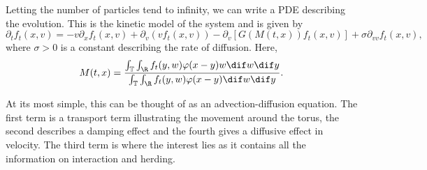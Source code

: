 Letting the number of particles tend to infinity, we can write a PDE describing the evolution. This is the kinetic model of the system and is given by
\begin{equation}\label{eq:fullPDE}
 \partial_t f_t(x,v) = -v\partial_x f_t(x,v)  +\partial_v\left( v f_t(x,v)\right) - \partial_v \left[ G(M(t,x))f_t(x,v)\right] + \sigma \partial_{vv}f_t(x,v),
\end{equation}
 where $\sigma > 0$ is a constant describing the rate of diffusion. Here, 
\[ M(t,x) =  \frac{\int_{\T}\int_{\R}f_t(y,w)\phi(x-y)w\dif w \dif y}{\int_{\T}\int_{\R}f_t(y,w)\phi(x-y)\dif w \dif y}. \]
 
At its most simple, this can be thought of as an advection-diffusion equation. The first term is a transport term illustrating the movement around the torus, the second describes a damping effect and the fourth gives a diffusive effect in velocity. The third term is where the interest lies as it contains all the information on interaction and herding.
 

